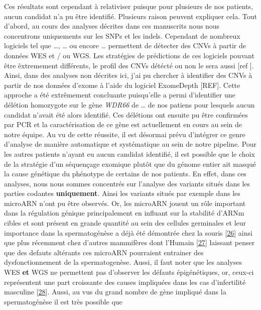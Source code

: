 \documentclass[12pt,twoside]{reedthesis}
\begin{document}
  Ces résultats sont cependant à relativiser puisque pour plusieurs de nos
  patients, aucun candidat n'a pu être identifié. Plusieurs raison peuvent
  expliquer cela. Tout d'abord, au cours des analyses décrites dans ces
  manuscrits nous nous concentrons uniquements sur les SNPs et les indels.
  Cependant de nombreux logiciels tel que \ldots{}, \ldots{} ou encore
  \ldots{} permettent de détecter des CNVs à partir de données WES et / ou
  WGS. Les stratégies de prédictions de ces logiciels pouvant être
  êxtremement différents, le profil des CNVs détécté ou non le sera aussi
  {[}ref {]}. Ainsi, dans des analyses non décrites ici, j'ai pu chercher
  à identifier des CNVs à partir de nos données d'exome à l'aide du
  logiciel ExomeDepth {[}REF{]}. Cette approche a été extrêmement
  concluante puisqu'elle a permi d'identifier une délétion homozygote sur
  le gène \emph{WDR66} de \ldots{} de nos patiens pour lesquels aucun
  candidat n'avait été alors identifié. Ces délétions ont ensuite pu être
  confirmées par PCR et la caractérisation de ce gène est actuellement en
  cours au sein de notre équipe. Au vu de cette réussite, il est désormai
  prévu d'intégrer ce genre d'analyse de manière automatique et
  systématique au sein de notre pipeline. Pour les autres patients n'ayant
  eu aucun candidat identifié, il est possible que le choix de la
  stratégie d'un séquençage exomique plutôt que du génome entier ait
  masqué la cause génétique du phénotype de certains de nos patients. En
  effet, dans ces analyses, nous nous sommes concentrés sur l'analyse des
  variants situés dans les parties codantes \textbf{uniquement}. Ainsi les
  variants situés par exemple dans les microARN n'ont pu être observés.
  Or, les microARN jouent un rôle important dans la régulation génique
  principalement en influant sur la stabilité d'ARNm cibles et sont
  présent en grande quantité au sein des cellules germinales et leur
  importance dans la spermatogénèse a déjà été démontrée chez la souris
  {[}\protect\hyperlink{ref-Comazzetto2014}{26}{]} ainsi que plus
  récemment chez d'autres mammifères dont l'Humain
  {[}\protect\hyperlink{ref-Chen2017}{27}{]} laissant penser que des
  defauts altérants ces microARN pourraient entrainer des
  dysfonctionnement de la spermatogenèse. Aussi, il faut noter que les
  analyses WES \textbf{et} WGS ne permettent pas d'observer les défauts
  épigénétiques, or, ceux-ci représentent une part croissante des causes
  impliquées dans les cas d'infertilité masculine
  {[}\protect\hyperlink{ref-Carrell2011}{28}{]}. Aussi, au vus du grand
  nombre de gène impliqué dans la spermatogénèse il est très possible que
\end{document}
